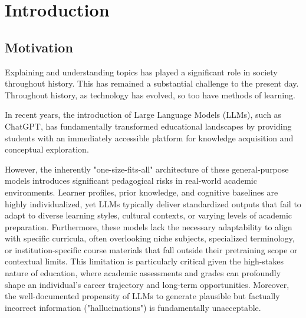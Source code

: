 \chapter{Introduction}
\label{chap:introduction}
\section{Motivation}
Explaining and understanding topics has played a significant role in society throughout history.
This has remained a substantial challenge to the present day.
Throughout history, as technology has evolved, so too have methods of learning.



In recent years, the introduction of Large Language Models (LLMs)\cite{brown2020languagemodelsfewshotlearners},
such as ChatGPT, has fundamentally transformed educational landscapes by providing students with an immediately
accessible platform for knowledge acquisition and conceptual exploration.

However, the inherently "one-size-fits-all" architecture of these general-purpose models introduces significant
pedagogical risks in real-world academic environments.
Learner profiles, prior knowledge, and cognitive baselines are highly individualized, yet LLMs typically deliver
standardized outputs that fail to adapt to diverse learning styles, cultural contexts, or varying levels
of academic preparation.
Furthermore, these models lack the necessary adaptability to align with specific curricula, often overlooking
niche subjects, specialized terminology, or institution-specific course materials that fall outside their pretraining
scope or contextual limits.
This limitation is particularly critical given the high-stakes nature of education, where academic assessments and
grades can profoundly shape an individual’s career trajectory and long-term opportunities. Moreover,
the well-documented propensity of LLMs to generate plausible but factually incorrect information ("hallucinations")
is fundamentally unacceptable.
